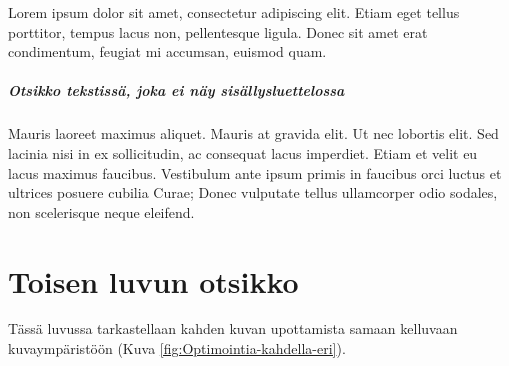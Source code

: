 \label{Alinotsikko}

Lorem ipsum dolor sit amet, consectetur adipiscing elit. Etiam eget
tellus porttitor, tempus lacus non, pellentesque ligula. Donec sit
amet erat condimentum, feugiat mi accumsan, euismod quam.

\paragraph{Otsikko tekstissä, joka ei näy sisällysluettelossa}

Mauris laoreet maximus aliquet. Mauris at gravida elit. Ut nec lobortis
elit. Sed lacinia nisi in ex sollicitudin, ac consequat lacus imperdiet.
Etiam et velit eu lacus maximus faucibus. Vestibulum ante ipsum primis
in faucibus orci luctus et ultrices posuere cubilia Curae; Donec vulputate
tellus ullamcorper odio sodales, non scelerisque neque eleifend.



\chapter{Toisen luvun otsikko} \label{Toinen luku}

Tässä luvussa tarkastellaan kahden kuvan upottamista samaan kelluvaan
kuvaympäristöön (Kuva \ref{fig:Optimointia-kahdella-eri}).

